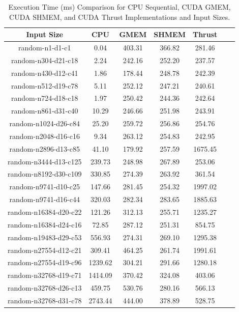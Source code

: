 \documentclass[letterpaper,12pt]{article}
\theoremstyle{remark}
\begin{document}
\begin{table}[ht]
\centering
\caption{Execution Time (ms) Comparison for CPU Sequential, CUDA GMEM, CUDA SHMEM, and CUDA Thrust Implementations and Input Sizes.}
\begin{tabular}{|c|c|c|c|c|c|c|}
\hline
\textbf{Input Size} & \textbf{CPU } & \textbf{ GMEM } & \textbf{ SHMEM } & \textbf{ Thrust } \\
\hline
random-n1-d1-c1      & 0.04     & 403.31  & 366.82  & 281.46 \\
random-n304-d21-c18  & 2.24     & 242.16  & 252.20  & 237.57 \\
random-n430-d12-c41  & 1.86     & 178.44  & 248.78  & 242.39 \\
random-n512-d19-c78  & 5.11     & 252.12  & 247.21  & 240.61 \\
random-n724-d18-c18  & 1.97     & 250.42  & 244.36  & 242.64 \\
random-n861-d31-c40  & 10.29    & 246.66  & 251.98  & 243.91 \\
random-n1024-d26-c84 & 25.20    & 259.72  & 256.86  & 254.76 \\
random-n2048-d16-c16 & 9.34     & 263.12  & 254.83  & 242.95 \\
random-n2896-d13-c85 & 41.10    & 179.92  & 257.59  & 1675.45 \\
random-n3444-d13-c125& 239.73   & 248.98  & 267.89  & 253.06 \\
random-n8192-d30-c109& 330.85   & 274.39  & 263.92  & 361.54 \\
random-n9741-d10-c25 & 147.66   & 281.45  & 254.32  & 1997.02 \\
random-n9741-d16-c44 & 320.03   & 282.34  & 283.65  & 1885.63 \\
random-n16384-d20-c22& 121.26   & 312.13  & 255.71  & 1235.27 \\
random-n16384-d24-c16& 72.85    & 287.12  & 251.31  & 854.75 \\
random-n19483-d29-c53& 556.93   & 274.31  & 269.10  & 1295.38 \\
random-n27554-d12-c21& 309.41   & 464.25  & 261.74  & 1991.61 \\
random-n27554-d19-c96& 1239.62  & 304.21  & 291.66  & 1280.18 \\
random-n32768-d19-c71& 1414.09  & 370.42  & 324.08  & 403.06 \\
random-n32768-d26-c13& 459.75   & 530.76  & 280.16  & 566.13 \\
random-n32768-d31-c78& 2743.44  & 444.00  & 378.89  & 528.75 \\

\end{tabular}
\end{table}
\end{document}
